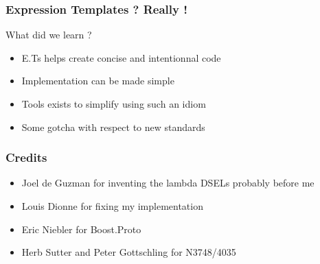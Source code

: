 
\frame
{
\begin{frame}
\frametitle{Expression Templates ? Really !}
\begin{block}{What did we learn ?}
\begin{itemize}
\item E.Ts helps create concise and intentionnal code
\item Implementation can be made simple
\item Tools exists to simplify using such an idiom
\item Some gotcha with respect to new standards
\end{itemize}
\end{block}{}
\end{frame}
}



\frame
{
  \frametitle{Credits}
  \begin{itemize}
  \item Joel de Guzman for inventing the lambda DSELs probably before me
  \item Louis Dionne for fixing my implementation
  \item Eric Niebler for Boost.Proto
  \item Herb Sutter and Peter Gottschling for N3748/4035
  \end{itemize}
}


